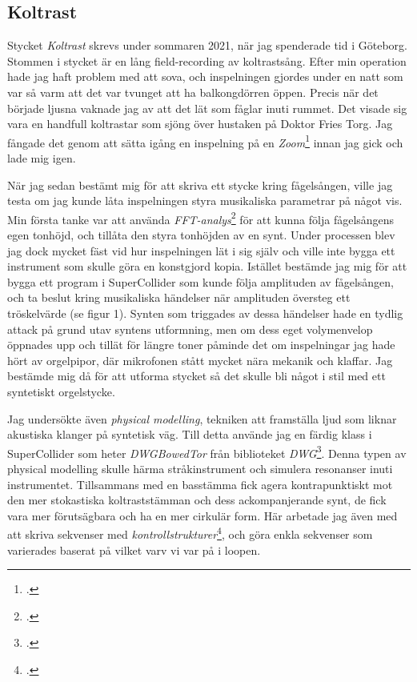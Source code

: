 \documentclass{article}
\begin{document}
\subsection{Koltrast}\nocite{KOLTRAST}
Stycket \emph{Koltrast} skrevs under sommaren 2021, när jag spenderade tid i Göteborg. Stommen i stycket är en
lång field-recording av koltrastsång. Efter min operation hade jag haft problem med att sova, och inspelningen
gjordes under en natt som var så varm att det var tvunget att ha balkongdörren öppen. Precis när det började
ljusna vaknade jag av att det lät som fåglar inuti rummet. Det visade sig vara en handfull koltrastar som
sjöng över hustaken på Doktor Fries Torg. Jag fångade det genom att sätta igång en inspelning på en  
\emph{Zoom}\footcite{zoom} innan
jag gick och lade mig igen. 

När jag sedan bestämt mig för att skriva ett stycke kring fågelsången, ville jag
testa om jag kunde låta inspelningen styra musikaliska parametrar på något vis. Min första tanke var att
använda \emph{FFT-analys}\footcite{fft} för att kunna följa
fågelsångens egen tonhöjd, och tillåta den styra tonhöjden av en synt. Under processen blev jag dock
mycket fäst vid hur inspelningen lät i sig själv och ville inte bygga ett instrument som skulle göra en
konstgjord kopia. Istället bestämde jag mig för att bygga ett program i
SuperCollider som kunde följa amplituden av fågelsången, och ta beslut kring musikaliska händelser när
amplituden översteg ett tröskelvärde (se figur 1). Synten som triggades av dessa händelser hade en tydlig attack på grund
utav syntens utformning, men om dess eget volymenvelop öppnades upp och tillät för längre toner påminde det om
inspelningar jag hade hört av orgelpipor, där mikrofonen stått mycket nära mekanik och klaffar. 
Jag bestämde mig då för att utforma stycket så det skulle bli något i stil med ett syntetiskt orgelstycke.

Jag undersökte även \emph{physical modelling}, tekniken att framställa ljud som liknar akustiska klanger på
syntetisk väg. Till detta använde jag en färdig klass i SuperCollider som heter \emph{DWGBowedTor} från biblioteket
\emph{DWG}\footcite{dwg}. Denna typen av physical modelling skulle
härma stråkinstrument och simulera resonanser inuti instrumentet. Tillsammans med en basstämma fick agera
kontrapunktiskt mot den mer stokastiska koltraststämman och dess ackompanjerande synt, de fick vara mer
förutsägbara och ha en mer cirkulär form. Här arbetade jag även med att skriva sekvenser med
\emph{kontrollstrukturer}\footcite{ctrl}, och göra enkla sekvenser som varierades baserat på vilket varv vi
var på i loopen.
\pagebreak
\end{document}
